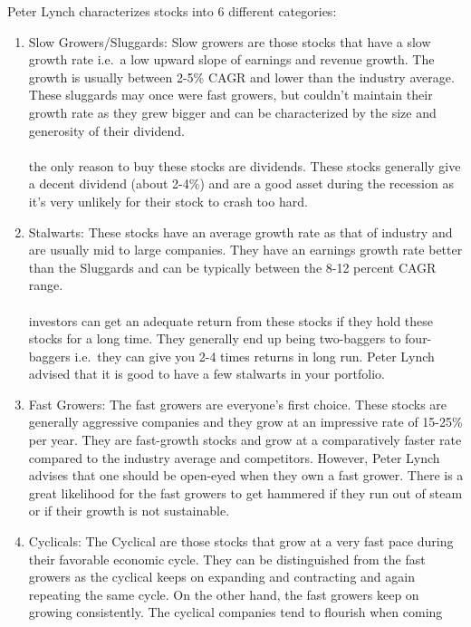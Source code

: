 Peter Lynch characterizes stocks into 6 different categories:
\begin{enumerate}
    \item Slow Growers/Sluggards: Slow growers are those stocks that have a slow
        growth rate i.e.\ a low upward slope of earnings and revenue growth. The
        growth is usually between 2-5\% CAGR and lower than the industry average.
        These sluggards may once were fast growers, but couldn’t maintain their
        growth rate as they grew bigger and can be characterized by the size and
        generosity of their dividend.\\\\
        the only reason to buy these stocks are dividends. These stocks generally
        give a decent dividend (about 2-4\%) and are a good asset during the
        recession as it’s very unlikely for their stock to crash too hard.
    \item Stalwarts: These stocks have an average growth rate as that of industry
        and are usually mid to large companies. They have an earnings growth
        rate better than the Sluggards and can be typically between the 8-12 percent
        CAGR range.\\\\
        investors can get an adequate return from these stocks if they hold
        these stocks for a long time. They generally end up being two-baggers to
        four-baggers i.e.\ they can give you 2-4 times returns in long run. Peter
        Lynch advised that it is good to have a few stalwarts in your portfolio.
    \item Fast Growers: The fast growers are everyone’s first choice. These stocks
        are generally aggressive companies and they grow at an impressive rate of
        15-25\% per year. They are fast-growth stocks and grow at a comparatively
        faster rate compared to the industry average and competitors. However,
        Peter Lynch advises that one should be open-eyed when they own a fast
        grower. There is a great likelihood for the fast growers to get hammered
        if they run out of steam or if their growth is not sustainable.
    \item Cyclicals: The Cyclical are those stocks that grow at a very fast pace
        during their favorable economic cycle. They can be distinguished from the
        fast growers as the cyclical keeps on expanding and contracting and again
        repeating the same cycle. On the other hand, the fast growers keep on
        growing consistently. The cyclical companies tend to flourish when coming

\end{enumerate}
